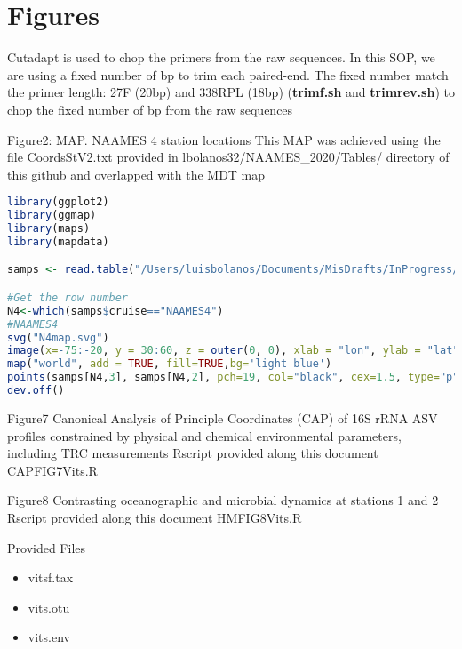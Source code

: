 \documentclass{article}
\begin{document}
\section{Figures}
Cutadapt is used to chop the primers from the raw sequences. In this SOP, we are using a fixed number of bp to trim each paired-end. The fixed number match the primer length: 27F (20bp) and 338RPL (18bp) (\textbf{trimf.sh} and \textbf{trimrev.sh}) to chop the fixed number of bp from the raw sequences

\begin{subsection}{Figure2: MAP. NAAMES 4 station locations}
This MAP was achieved using the file CoordsStV2.txt provided in lbolanos32/NAAMES\_2020/Tables/ directory of this github and overlapped with the MDT map

\begin{lstlisting}[language=R]
library(ggplot2)
library(ggmap)
library(maps)
library(mapdata)

samps <- read.table("/Users/luisbolanos/Documents/MisDrafts/InProgress/NAAMES_annual/CoordsStV2.txt", header=T,sep="\t")

#Get the row number
N4<-which(samps$cruise=="NAAMES4")
#NAAMES4
svg("N4map.svg")
image(x=-75:-20, y = 30:60, z = outer(0, 0), xlab = "lon", ylab = "lat")
map("world", add = TRUE, fill=TRUE,bg='light blue')
points(samps[N4,3], samps[N4,2], pch=19, col="black", cex=1.5, type="p")
dev.off()
\end{lstlisting}


\end{subsection}

\begin{subsection}{Figure7 Canonical Analysis of Principle Coordinates (CAP) of 16S rRNA ASV profiles constrained by physical and chemical environmental parameters, including TRC measurements}
Rscript provided along this document CAPFIG7Vits.R
\end{subsection}

\begin{subsection}{Figure8 Contrasting oceanographic and microbial dynamics at stations 1 and 2}
Rscript provided along this document HMFIG8Vits.R
\end{subsection}

\begin{section}{Provided Files}
\begin{itemize}
\item vitsf.tax
\item vits.otu
\item vits.env
\end{itemize}
\end{section}
\end{document}
